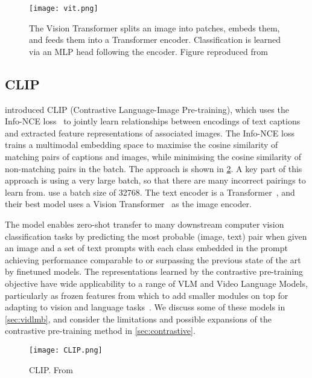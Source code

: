 \begin{figure}[tp]
	\centering
	\texttt{[image: vit.png]}
	\caption{The Vision Transformer splits an image into patches, embeds them,
		and feeds them into a Transformer encoder. Classification is learned
		via an MLP head following the encoder. Figure reproduced
		from~\citet{dosovitskiy2021vit}}
	\label{fig:vit}
\end{figure}


\subsection{CLIP}
\label{ssec:clip}

\citet{radford2021clip} introduced CLIP (Contrastive Language-Image
Pre-training), which uses the Info-NCE loss~\citep{oord2019infonce} to jointly
learn relationships between encodings of text captions and extracted feature
representations of associated images. The Info-NCE loss trains a multimodal
embedding space to maximise the cosine similarity of matching pairs of captions
and images, while minimising the cosine similarity of non-matching pairs in the
batch. The approach is shown in \cref{fig:clip}. A key part of this approach is
using a very large batch, so that there are many incorrect pairings to learn
from. \citet{radford2021clip} use a batch size of 32768. The text encoder is a
Transformer~\citep{vaswani2017attention}, and their best model uses a Vision
Transformer~\citep{dosovitskiy2021vit} as the image encoder.

The model enables zero-shot transfer to many downstream computer vision
classification tasks by predicting the most probable (image, text) pair when
given an image and a set of text prompts with each class embedded in the prompt
achieving performance comparable to or surpassing the previous state of the art
by finetuned models. The representations learned by the contrastive
pre-training objective have wide applicability to a range of VLM and Video
Language Models, particularly as frozen features from which to add smaller
modules on top for adapting to vision and language
tasks~\citep{alayrac2022flamingo,lin2022evl,luo2022clip4clip}. We discuss some
of these models in \cref{sec:vidlmb}, and consider the limitations and possible
expansions of the contrastive pre-training method in \cref{sec:contrastive}.

\begin{figure}[tp]
	\centering
	\texttt{[image: CLIP.png]}
	\caption{CLIP. From~\citet{radford2021clip}}
	\label{fig:clip}
\end{figure}



